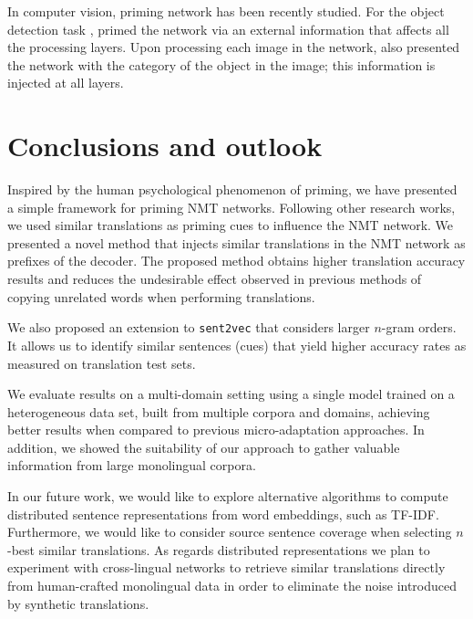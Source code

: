 In computer vision, priming network has been recently studied. For the object detection task , \citet{Rosenfeld18Priming} primed the network via an external information that affects all the processing layers. Upon processing each image in the network, \citet{Rosenfeld18Priming} also presented the network with the category of the object in the image; this information is injected at all layers. 

\section{Conclusions and outlook}
\label{sec:conclusions}

Inspired by the human psychological phenomenon of priming, we have presented a simple framework for priming NMT networks.
%
Following other research works, we used similar translations as priming cues to influence the NMT network.
%
We presented a novel method that injects similar translations in the NMT network as prefixes of the decoder.
The proposed method obtains higher translation accuracy results and reduces the undesirable effect observed in previous methods of copying unrelated words when performing translations. 

We also proposed an extension to \texttt{sent2vec} that considers larger $n$-gram orders. It allows us to identify similar sentences (cues) that yield higher accuracy rates as measured on translation test sets.

We evaluate results on a multi-domain setting using a single model trained on a heterogeneous data set, built from multiple corpora and domains, achieving better results when compared to previous micro-adaptation approaches. In addition, we showed the suitability of our approach to gather valuable information from large monolingual corpora. 

In our future work, we would like to explore alternative algorithms to compute distributed sentence representations from word embeddings, such as TF-IDF. Furthermore, we would like to consider source sentence coverage when selecting $n$-best similar translations.
As regards distributed representations we plan to experiment with cross-lingual networks to retrieve similar translations directly from human-crafted monolingual data in order to eliminate the noise introduced by synthetic translations.
